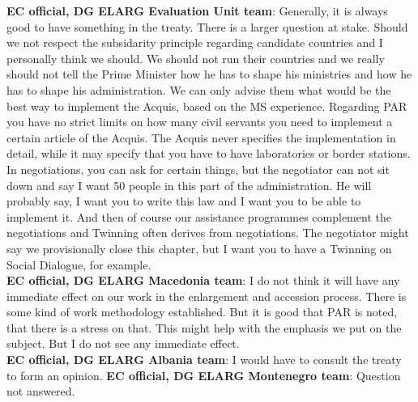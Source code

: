 \textbf{EC official, DG ELARG Evaluation Unit team}: Generally, it is always good to have something in the treaty. There is a larger question at stake. Should we not respect the subsidarity principle regarding candidate countries and I personally think we should. We should not run their countries and we really should not tell the Prime Minister how he has to shape his ministries and how he has to shape his administration. We can only advise them what would be the best way to implement the Acquis, based on the MS experience. Regarding PAR you have no strict limits on how many civil servants you need to implement a certain article of the Acquis. The Acquis never specifies the implementation in detail, while it may specify that you have to have laboratories or border stations. In negotiations, you can ask for certain things, but the negotiator can not sit down and say I want 50 people in this part of the administration. He will probably say, I want you to write this law and I want you to be able to implement it. And then of course our assistance programmes complement the negotiations and Twinning often derives from negotiations. The negotiator might say we provisionally close this chapter, but I want you to have a Twinning on Social Dialogue, for example.\\
\textbf{EC official, DG ELARG Macedonia team}: I do not think it will have any immediate effect on our work in the enlargement and accession process. There is some kind of work methodology established. But it is good that PAR is noted, that there is a stress on that. This might help with the emphasis we put on the subject. But I do not see any immediate effect. \\
\textbf{EC official, DG ELARG Albania team}: I would have to consult the treaty to form an opinion. 
\textbf{EC official, DG ELARG Montenegro team}: Question not answered.\\
